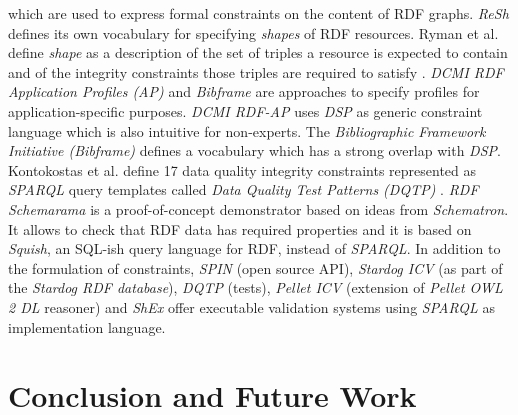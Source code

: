 \documentclass[a4paper,fontsize=11pt]{scrartcl}
\begin{document}
which are used to express formal constraints on the content of RDF graphs.
%
\emph{ReSh} defines its own vocabulary for specifying \emph{shapes} of RDF resources.
Ryman et al. define \emph{shape} as a description of the set of triples a resource is expected to contain and of the integrity constraints those triples are required to satisfy \cite{Ryman2013}. 
%
\emph{DCMI RDF Application Profiles (AP)} and \emph{Bibframe} are approaches to specify profiles for application-specific purposes. 
\emph{DCMI RDF-AP} uses \emph{DSP} as generic constraint language which is also intuitive for non-experts.
The \emph{Bibliographic Framework Initiative (Bibframe)} defines a vocabulary which has a strong overlap with \emph{DSP}.
%
Kontokostas et al. define 17 data quality integrity constraints represented as \emph{SPARQL} query templates called \emph{Data Quality Test Patterns (DQTP)} \cite{Kontokostas2014}. 
%
\emph{RDF Schemarama} 
is a proof-of-concept demonstrator based on ideas from \emph{Schematron}. 
It allows to check that RDF data has required properties and
it is based on \emph{Squish}, an SQL-ish query language for RDF, instead of \emph{SPARQL}. 
%
%
%
In addition to the formulation of constraints, \emph{SPIN} (open source API), \emph{Stardog ICV} (as part of the \emph{Stardog RDF database}), \emph{DQTP} (tests), \emph{Pellet ICV} (extension of \emph{Pellet OWL 2 DL} reasoner) and \emph{ShEx} offer executable validation systems using \emph{SPARQL} as implementation language.

\section{Conclusion and Future Work}

\end{document}
